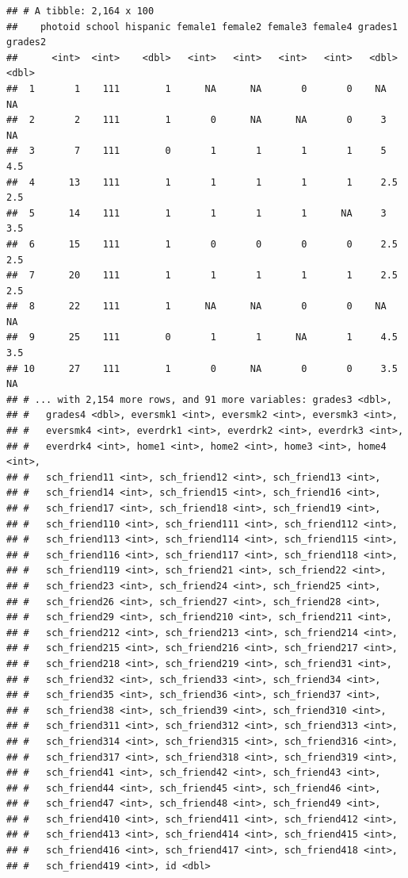\documentclass[
]{book}
\begin{document}
\begin{verbatim}
## # A tibble: 2,164 x 100
##    photoid school hispanic female1 female2 female3 female4 grades1 grades2
##      <int>  <int>    <dbl>   <int>   <int>   <int>   <int>   <dbl>   <dbl>
##  1       1    111        1      NA      NA       0       0    NA      NA  
##  2       2    111        1       0      NA      NA       0     3      NA  
##  3       7    111        0       1       1       1       1     5       4.5
##  4      13    111        1       1       1       1       1     2.5     2.5
##  5      14    111        1       1       1       1      NA     3       3.5
##  6      15    111        1       0       0       0       0     2.5     2.5
##  7      20    111        1       1       1       1       1     2.5     2.5
##  8      22    111        1      NA      NA       0       0    NA      NA  
##  9      25    111        0       1       1      NA       1     4.5     3.5
## 10      27    111        1       0      NA       0       0     3.5    NA  
## # ... with 2,154 more rows, and 91 more variables: grades3 <dbl>,
## #   grades4 <dbl>, eversmk1 <int>, eversmk2 <int>, eversmk3 <int>,
## #   eversmk4 <int>, everdrk1 <int>, everdrk2 <int>, everdrk3 <int>,
## #   everdrk4 <int>, home1 <int>, home2 <int>, home3 <int>, home4 <int>,
## #   sch_friend11 <int>, sch_friend12 <int>, sch_friend13 <int>,
## #   sch_friend14 <int>, sch_friend15 <int>, sch_friend16 <int>,
## #   sch_friend17 <int>, sch_friend18 <int>, sch_friend19 <int>,
## #   sch_friend110 <int>, sch_friend111 <int>, sch_friend112 <int>,
## #   sch_friend113 <int>, sch_friend114 <int>, sch_friend115 <int>,
## #   sch_friend116 <int>, sch_friend117 <int>, sch_friend118 <int>,
## #   sch_friend119 <int>, sch_friend21 <int>, sch_friend22 <int>,
## #   sch_friend23 <int>, sch_friend24 <int>, sch_friend25 <int>,
## #   sch_friend26 <int>, sch_friend27 <int>, sch_friend28 <int>,
## #   sch_friend29 <int>, sch_friend210 <int>, sch_friend211 <int>,
## #   sch_friend212 <int>, sch_friend213 <int>, sch_friend214 <int>,
## #   sch_friend215 <int>, sch_friend216 <int>, sch_friend217 <int>,
## #   sch_friend218 <int>, sch_friend219 <int>, sch_friend31 <int>,
## #   sch_friend32 <int>, sch_friend33 <int>, sch_friend34 <int>,
## #   sch_friend35 <int>, sch_friend36 <int>, sch_friend37 <int>,
## #   sch_friend38 <int>, sch_friend39 <int>, sch_friend310 <int>,
## #   sch_friend311 <int>, sch_friend312 <int>, sch_friend313 <int>,
## #   sch_friend314 <int>, sch_friend315 <int>, sch_friend316 <int>,
## #   sch_friend317 <int>, sch_friend318 <int>, sch_friend319 <int>,
## #   sch_friend41 <int>, sch_friend42 <int>, sch_friend43 <int>,
## #   sch_friend44 <int>, sch_friend45 <int>, sch_friend46 <int>,
## #   sch_friend47 <int>, sch_friend48 <int>, sch_friend49 <int>,
## #   sch_friend410 <int>, sch_friend411 <int>, sch_friend412 <int>,
## #   sch_friend413 <int>, sch_friend414 <int>, sch_friend415 <int>,
## #   sch_friend416 <int>, sch_friend417 <int>, sch_friend418 <int>,
## #   sch_friend419 <int>, id <dbl>
\end{verbatim}
\end{document}
